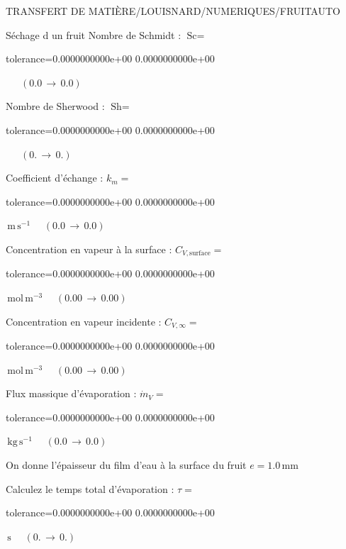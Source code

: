 \documentclass[12pt]{article}
\begin{document}
\begin{quiz}{TRANSFERT DE MATIÈRE/LOUISNARD/NUMERIQUES/FRUITAUTO}
\begin{cloze}{Séchage d un fruit}
Nombre de Schmidt : $\text{Sc} =  $
\begin{numerical}[points=1] 
\item[tolerance={0.0000000000e+00}] 0.0000000000e+00 
\end{numerical} 
 $\,$ 
 $ \quad (0.0 \, \rightarrow \, 0.0) $ 

Nombre de Sherwood : $\text{Sh} =  $
\begin{numerical}[points=2] 
\item[tolerance={0.0000000000e+00}] 0.0000000000e+00 
\end{numerical} 
 $\,$ 
 $ \quad (0. \, \rightarrow \, 0.) $ 

Coefficient d'échange : $k_m =  $
\begin{numerical}[points=1] 
\item[tolerance={0.0000000000e+00}] 0.0000000000e+00 
\end{numerical} 
 $\,  \mathrm{m}\,  \mathrm{s}^{-1}$ 
 $ \quad (0.0 \, \rightarrow \, 0.0) $ 

Concentration en vapeur à la surface : $C_{V, \text{surface}} =  $
\begin{numerical}[points=2] 
\item[tolerance={0.0000000000e+00}] 0.0000000000e+00 
\end{numerical} 
 $\,  \mathrm{mol}\,  \mathrm{m}^{-3}$ 
 $ \quad (0.00 \, \rightarrow \, 0.00) $ 

Concentration en vapeur incidente : $C_{V, \infty} =  $
\begin{numerical}[points=2] 
\item[tolerance={0.0000000000e+00}] 0.0000000000e+00 
\end{numerical} 
 $\,  \mathrm{mol}\,  \mathrm{m}^{-3}$ 
 $ \quad (0.00 \, \rightarrow \, 0.00) $ 

Flux massique d'évaporation : $\dot{m}_V =  $
\begin{numerical}[points=1] 
\item[tolerance={0.0000000000e+00}] 0.0000000000e+00 
\end{numerical} 
 $\,  \mathrm{kg}\,  \mathrm{s}^{-1}$ 
 $ \quad (0.0 \, \rightarrow \, 0.0) $ 

 

On donne l'épaisseur du film d'eau à la surface du fruit $e = 1.0\,  \mathrm{mm} $

Calculez le temps total d'évaporation : $\tau =  $
\begin{numerical}[points=2] 
\item[tolerance={0.0000000000e+00}] 0.0000000000e+00 
\end{numerical} 
 $\,  \mathrm{s}$ 
 $ \quad (0. \, \rightarrow \, 0.) $ 


\end{cloze}
\end{quiz}
\end{document}
